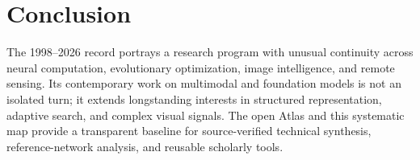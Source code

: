 \documentclass[11pt]{article}
\begin{document}
\section{Conclusion}

The 1998--2026 record portrays a research program with unusual continuity
across neural computation, evolutionary optimization, image intelligence, and
remote sensing. Its contemporary work on multimodal and foundation models is
not an isolated turn; it extends longstanding interests in structured
representation, adaptive search, and complex visual signals. The open Atlas
and this systematic map provide a transparent baseline for source-verified
technical synthesis, reference-network analysis, and reusable scholarly tools.



\end{document}
